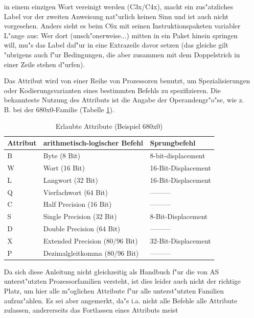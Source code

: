 \documentclass[12pt,a4paper,twoside]{report}
\newcommand{\asname}{AS}
\begin{document}
in einem einzigen Wort vereinigt werden (C3x/C4x), macht ein zus"atzliches
Label vor der zweiten Anweisung nat"urlich keinen Sinn und ist auch nicht
vorgesehen.  Anders sieht es beim C6x mit seinen Instruktionspaketen
variabler L"ange aus: Wer dort (unsch"onerweise...) mitten in ein Paket
hinein springen will, mu"s das Label daf"ur in eine Extrazeile davor setzen
(das gleiche gilt "ubrigens auch f"ur Bedingungen, die aber zusammen mit
dem Doppelstrich in einer Zeile stehen d"urfen).
\par
Das Attribut wird von einer Reihe von Prozessoren benutzt, um
Spezialisierungen oder Kodierungsvarianten eines bestimmten Befehls zu
spezifizieren.  Die bekannteste Nutzung des Attributs ist die Angabe der
Operandengr"o"se, wie z. B. bei der 680x0-Familie (Tabelle
\ref{TabAttrs}).
\begin{table}[htb]
\begin{center}\begin{tabular}{|l|l|l|}
\hline
Attribut & arithmetisch-logischer Befehl & Sprungbefehl \\
\hline
\hline
B     & Byte (8 Bit)                   & 8-bit-displacement \\
W     & Wort (16 Bit)                  & 16-Bit-Displacement \\
L     & Langwort (32 Bit)              & 16-Bit-Displacement \\
Q     & Vierfachwort (64 Bit)          & --------- \\
C     & Half Precision (16 Bit)        & --------- \\
S     & Single Precision (32 Bit)      & 8-Bit-Displacement \\
D     & Double Precision (64 Bit)      & --------- \\
X     & Extended Precision (80/96 Bit) & 32-Bit-Displacement \\
P     & Dezimalgleitkomma (80/96 Bit)  & --------- \\
\hline
\end{tabular}\end{center}
\caption{Erlaubte Attribute (Beispiel 680x0) \label{TabAttrs}}
\end{table}
\par
Da sich diese Anleitung nicht gleichzeitig als Handbuch f"ur die von \asname{}
unterst"utzten Prozessorfamilien versteht, ist dies leider auch nicht der
richtige Platz, um hier alle m"oglichen Attribute f"ur alle unterst"utzten
Familien aufzuz"ahlen.  Es sei aber angemerkt, da"s i.a. nicht alle Befehle
alle Attribute zulassen, andererseits das Fortlassen eines Attributs meist
\end{document}
